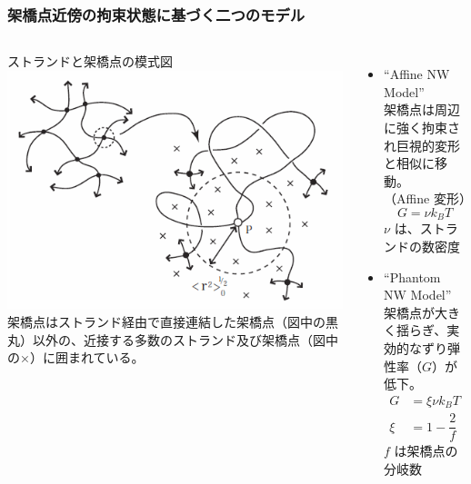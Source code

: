 \documentclass[11pt, dvipdfmx]{beamer}
\begin{document}
    \begin{frame}
        \frametitle{架橋点近傍の拘束状態に基づく二つのモデル}
		\vspace{-3mm}
        \begin{columns}[totalwidth=1\textwidth]
        ストランドと架橋点の模式図
        \includegraphics[width=\textwidth]{./fig/JP_vicinity.png}
        架橋点はストランド経由で直接連結した架橋点（図中の黒丸）以外の、近接する多数のストランド及び架橋点（図中の×）に囲まれている。
        \begin{itemize}
        \item
        ``Affine NW Model''\\
        架橋点は周辺に強く拘束され巨視的変形と相似に移動。\\（Affine 変形）
        \footnotesize
        \begin{equation*}
        G=\nu k_B T
        \end{equation*}
        \normalsize
        $\nu$ は、ストランドの数密度
        \item
        ``Phantom NW Model''\\
        架橋点が大きく揺らぎ、実効的なずり弾性率（$G$）が低下。
        \footnotesize
        \begin{align*}
        G&=\xi \nu k_B T \\
        \xi&= 1 -\dfrac{2}{f}
        \end{align*}
        \normalsize
        $f$ は架橋点の分岐数
        \end{itemize}
        \end{columns}
        \end{frame}
\end{document}
